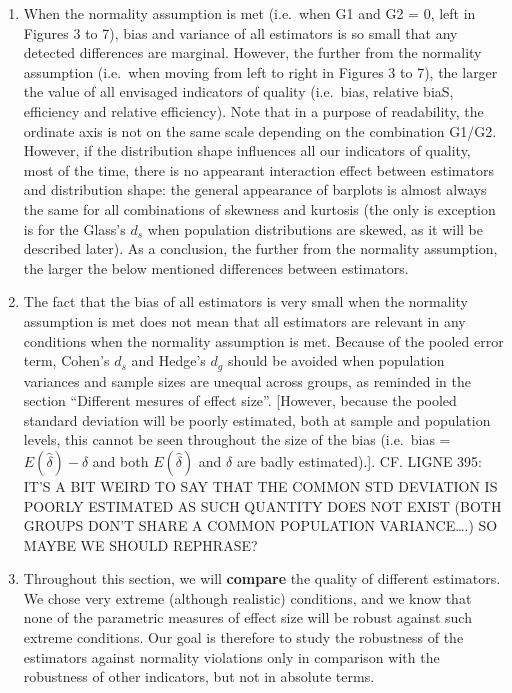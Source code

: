 \documentclass[
  man,floatsintext]{apa6}
\begin{document}
\begin{enumerate}
\def\labelenumi{\arabic{enumi})}
\item
  When the normality assumption is met (i.e.~when G1 and G2 = 0, left in Figures 3 to 7), bias and variance of all estimators is so small that any detected differences are marginal. However, the further from the normality assumption (i.e.~when moving from left to right in Figures 3 to 7), the larger the value of all envisaged indicators of quality (i.e.~bias, relative biaS, efficiency and relative efficiency). Note that in a purpose of readability, the ordinate axis is not on the same scale depending on the combination G1/G2. However, if the distribution shape influences all our indicators of quality, most of the time, there is no appearant interaction effect between estimators and distribution shape: the general appearance of barplots is almost always the same for all combinations of skewness and kurtosis (the only is exception is for the Glass's \(d_s\) when population distributions are skewed, as it will be described later). As a conclusion, the further from the normality assumption, the larger the below mentioned differences between estimators.
\item
  The fact that the bias of all estimators is very small when the normality assumption is met does not mean that all estimators are relevant in any conditions when the normality assumption is met. Because of the pooled error term, Cohen's \(d_s\) and Hedge's \(d_g\) should be avoided when population variances and sample sizes are unequal across groups, as reminded in the section \enquote{Different mesures of effect size}. {[}However, because the pooled standard deviation will be poorly estimated, both at sample and population levels, this cannot be seen throughout the size of the bias (i.e.~bias = \(E(\hat{\delta})-\delta\) and both \(E(\hat{\delta})\) and \(\delta\) are badly estimated).{]}. CF. LIGNE 395: IT'S A BIT WEIRD TO SAY THAT THE COMMON STD DEVIATION IS POORLY ESTIMATED AS SUCH QUANTITY DOES NOT EXIST (BOTH GROUPS DON'T SHARE A COMMON POPULATION VARIANCE\ldots.) SO MAYBE WE SHOULD REPHRASE?
\item
  Throughout this section, we will \textbf{compare} the quality of different estimators. We chose very extreme (although realistic) conditions, and we know that none of the parametric measures of effect size will be robust against such extreme conditions. Our goal is therefore to study the robustness of the estimators against normality violations only in comparison with the robustness of other indicators, but not in absolute terms.
\end{enumerate}
\end{document}
